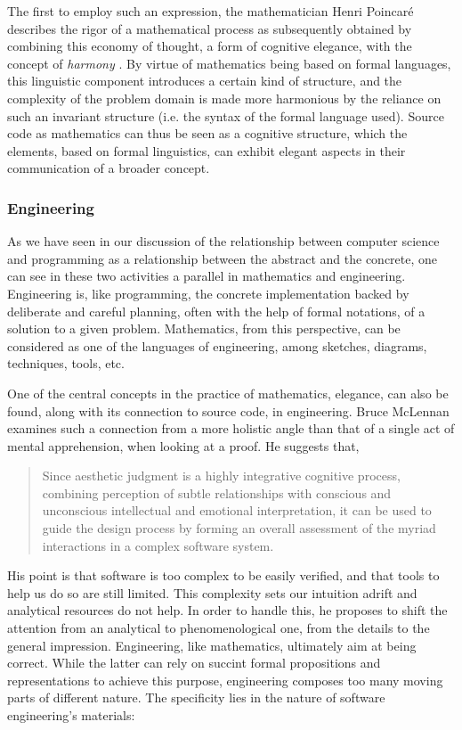 The first to employ such an expression, the mathematician Henri Poincaré describes the rigor of a mathematical process as subsequently obtained by combining this economy of thought, a form of cognitive elegance, with the concept of \emph{harmony} \citep{poincare_science_1908}. By virtue of mathematics being based on formal languages, this linguistic component introduces a certain kind of structure, and the complexity of the problem domain is made more harmonious by the reliance on such an invariant structure (i.e. the syntax of the formal language used). Source code as mathematics can thus be seen as a cognitive structure, which the elements, based on formal linguistics, can exhibit elegant aspects in their communication of a broader concept.

\subsubsection{Engineering} %

As we have seen in our discussion of the relationship between computer science and programming as a relationship between the abstract and the concrete, one can see in these two activities a parallel in mathematics and engineering. Engineering is, like programming, the concrete implementation backed by deliberate and careful planning, often with the help of formal notations, of a solution to a given problem. Mathematics, from this perspective, can be considered as one of the languages of engineering, among sketches, diagrams, techniques, tools, etc.

One of the central concepts in the practice of mathematics, elegance, can also be found, along with its connection to source code, in engineering. Bruce McLennan examines such a connection from a more holistic angle than that of a single act of mental apprehension, when looking at a proof. He suggests that,

\begin{quote}
  Since aesthetic judgment is a highly integrative cognitive process, combining perception of subtle relationships with conscious and unconscious intellectual and emotional interpretation, it can be used to guide the design process by forming an overall assessment of the myriad interactions in a complex software system. \citep{schummer_aesthetic_2009}
\end{quote}

His point is that software is too complex to be easily verified, and that tools to help us do so are still limited. This complexity sets our intuition adrift and analytical resources do not help. In order to handle this, he proposes to shift the attention from an analytical to phenomenological one, from the details to the general impression. Engineering, like mathematics, ultimately aim at being correct. While the latter can rely on succint formal propositions and representations to achieve this purpose, engineering composes too many moving parts of different nature. The specificity lies in the nature of software engineering's materials:

